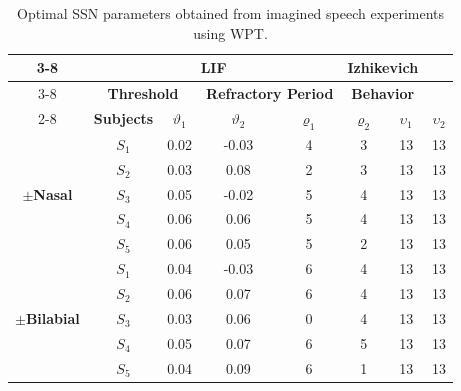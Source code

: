 \begin{table}[h!]
	\centering
	\caption{Optimal SSN parameters obtained from imagined speech experiments using WPT.}
	\begin{tabular}{|*{8}{c|}}
		\cline{3-8}
		\multicolumn{2}{c|}{\multirow{1}{*}} & \multicolumn{4}{c|}{\textbf{LIF}} & \multicolumn{2}{c|}{\textbf{Izhikevich}} \\\cline{3-8}
		\multicolumn{2}{c|}{\multirow{1}{*}} & \multicolumn{2}{c|}{\textbf{Threshold}} & \multicolumn{2}{c|}{\textbf{Refractory Period}} & \multicolumn{2}{c|}{\textbf{Behavior}} \\\cline{2-8}
		\multicolumn{1}{c|}{\multirow{1}{*}} & \textbf{Subjects} & \multicolumn{1}{c|}{\boldmath$\vartheta_{1}$} & \multicolumn{1}{c|}{\boldmath$\vartheta_{2}$} & \multicolumn{1}{c|}{\boldmath$\varrho_{1}$} & \multicolumn{1}{c|}{\boldmath$\varrho_{2}$} & \multicolumn{1}{c|}{\boldmath$\upsilon_{1}$} & \multicolumn{1}{c|}{\boldmath$\upsilon_{2}$} \\\hline
		\multirow{5}{*}{\begin{sideways}\boldmath$\pm$\textbf{Nasal}\end{sideways}} & \boldmath$S_{1}$ & 0.02  & -0.03 & 4     & 3     & 13    & 13 \\\cline{2-8}
		& \boldmath$S_{2}$ & 0.03  & 0.08  & 2     & 3     & 13    & 13 \\\cline{2-8}
		& \boldmath$S_{3}$ & 0.05  & -0.02 & 5     & 4     & 13    & 13 \\\cline{2-8}
		& \boldmath$S_{4}$ & 0.06  & 0.06  & 5     & 4     & 13    & 13 \\\cline{2-8}
		& \boldmath$S_{5}$ & 0.06  & 0.05  & 5     & 2     & 13    & 13 \\\hline
		\multirow{5}{*}{\begin{sideways}\boldmath$\pm$\textbf{Bilabial}\end{sideways}} & \boldmath$S_{1}$ & 0.04  & -0.03 & 6     & 4     & 13    & 13 \\\cline{2-8}
		& \boldmath$S_{2}$ & 0.06  & 0.07  & 6     & 4     & 13    & 13 \\\cline{2-8}
		& \boldmath$S_{3}$ & 0.03  & 0.06  & 0     & 4     & 13    & 13 \\\cline{2-8}
		& \boldmath$S_{4}$ & 0.05  & 0.07  & 6     & 5     & 13    & 13 \\\cline{2-8}
		& \boldmath$S_{5}$ & 0.04  & 0.09  & 6     & 1     & 13    & 13 \\\hline
	\end{tabular}%
	\label{Table: SSN_Optimal_WPT}%
\end{table}%